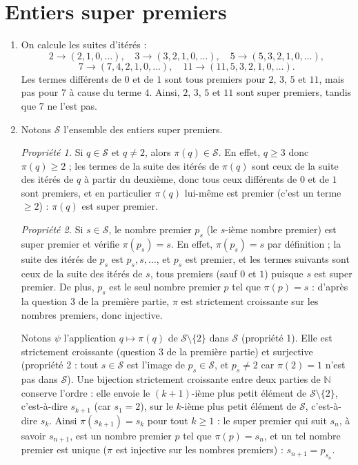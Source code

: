 \section*{Entiers super premiers}

\begin{enumerate}
\item On calcule les suites d’itérés :
\[
2 \to (2, 1, 0, \dots),\quad
3 \to (3, 2, 1, 0, \dots),\quad
5 \to (5, 3, 2, 1, 0, \dots),
\]
\[
7 \to (7, 4, 2, 1, 0, \dots),\quad
11 \to (11, 5, 3, 2, 1, 0, \dots).
\]
Les termes différents de \(0\) et de \(1\) sont tous premiers pour \(2\), \(3\), \(5\) et \(11\), mais pas pour \(7\) à cause du terme \(4\). Ainsi, \(2\), \(3\), \(5\) et \(11\) sont super premiers, tandis que \(7\) ne l’est pas.

\item Notons \(\mathcal{S}\) l'ensemble des entiers super premiers.

\emph{Propriété 1.} Si \(q \in \mathcal{S}\) et \(q \neq 2\), alors \(\pi(q) \in \mathcal{S}\). En effet, \(q \geqslant 3\) donc \(\pi(q) \geqslant 2\) ; les termes de la suite des itérés de \(\pi(q)\) sont ceux de la suite des itérés de \(q\) à partir du deuxième, donc tous ceux différents de \(0\) et de \(1\) sont premiers, et en particulier \(\pi(q)\) lui-même est premier (c'est un terme \(\geqslant 2\)) : \(\pi(q)\) est super premier.

\emph{Propriété 2.} Si \(s \in \mathcal{S}\), le nombre premier \(p_s\) (le \(s\)-ième nombre premier) est super premier et vérifie \(\pi(p_s) = s\). En effet, \(\pi(p_s) = s\) par définition ; la suite des itérés de \(p_s\) est \(p_s, s, \dots\), et \(p_s\) est premier, et les termes suivants sont ceux de la suite des itérés de \(s\), tous premiers (sauf \(0\) et \(1\)) puisque \(s\) est super premier. De plus, \(p_s\) est le seul nombre premier \(p\) tel que \(\pi(p) = s\) : d'après la question 3 de la première partie, \(\pi\) est strictement croissante sur les nombres premiers, donc injective.

Notons \(\psi\) l'application \(q \mapsto \pi(q)\) de \(\mathcal{S} \setminus \{2\}\) dans \(\mathcal{S}\) (propriété 1). Elle est strictement croissante (question 3 de la première partie) et surjective (propriété 2 : tout \(s \in \mathcal{S}\) est l'image de \(p_s \in \mathcal{S}\), et \(p_s \neq 2\) car \(\pi(2) = 1\) n'est pas dans \(\mathcal{S}\)). Une bijection strictement croissante entre deux parties de \(\mathbb{N}\) conserve l'ordre : elle envoie le \((k+1)\)-ième plus petit élément de \(\mathcal{S} \setminus \{2\}\), c'est-à-dire \(s_{k+1}\) (car \(s_1 = 2\)), sur le \(k\)-ième plus petit élément de \(\mathcal{S}\), c'est-à-dire \(s_k\). Ainsi \(\pi(s_{k+1}) = s_k\) pour tout \(k \geqslant 1\) : le super premier qui suit \(s_n\), à savoir \(s_{n+1}\), est un nombre premier \(p\) tel que \(\pi(p) = s_n\), et un tel nombre premier est unique (\(\pi\) est injective sur les nombres premiers) : \(s_{n+1} = p_{s_n}\).


\end{enumerate}

